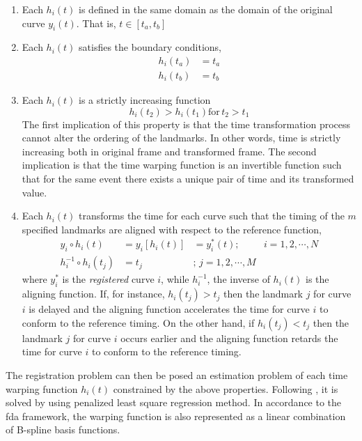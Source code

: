 \begin{enumerate}
	\item Each $h_i(t)$ is defined in the same domain as the domain of the original curve $y_i(t)$. That is, $t \in [t_a, t_b]$
  \item Each $h_i(t)$ satisfies the boundary conditions,
    \begin{equation}
      \begin{split}
        h_i(t_a) & = t_a \\
        h_i(t_b) & = t_b
      \end{split}
    \label{eq:warping_boundaries}
    \end{equation}
   \item Each $h_i(t)$ is a strictly increasing function 
         \begin{equation}
            h_i(t_2) > h_i(t_1) \text{for} \, t_2 > t_1
         \label{eq:warping_increasing}
         \end{equation}
         The first implication of this property is that the time transformation process cannot alter the ordering of the landmarks.
         In other words, time is strictly increasing both in original frame and transformed frame.
         The second implication is that the time warping function is an invertible function 
         such that for the same event there exists a unique pair of time and its transformed value.
    \item Each $h_i(t)$ transforms the time for each curve such that the timing of the $m$ specified landmarks are aligned with respect to the reference function,
          \begin{equation}
            \begin{split}
              y_i \circ h_i(t) & = y_i [h_i(t)] & = y^*_i(t) ; \, & i = 1, 2, \cdots, N  \\
              h_i^{-1} \circ h_i (t_j) & = t_j  & ; \, j = 1, 2, \cdots, M & 
            \end{split}
          \label{eq:warping_transformation}
          \end{equation}
          where $y_i^*$ is the \emph{registered} curve $i$, while $h_i^{-1}$, the inverse of $h_i(t)$ is the aligning function.
          If, for instance, $h_i(t_j) > t_j$ then the landmark $j$ for curve $i$ is delayed 
          and the aligning function accelerates the time for curve $i$ to conform to the reference timing.
          On the other hand, if $h_i(t_j) < t_j$ then the landmark $j$ for curve $i$ occurs earlier
          and the aligning function retards the time for curve $i$ to conform to the reference timing.
\end{enumerate}

The registration problem can then be posed an estimation problem of each time warping function $h_i(t)$ constrained by the above properties.
Following \cite{Ramsay1998}, it is solved by using penalized least square regression method.
In accordance to the \gls{fda} framework, the warping function is also represented as a linear combination of B-spline basis functions.